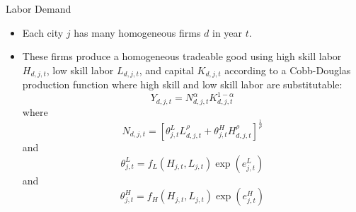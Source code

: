 \documentclass[aspectratio=169]{beamer}
\begin{document}
\begin{frame}{Labor Demand}

\begin{itemize}
    \item<1-> Each city $ j $ has many homogeneous firms $ d $ in year $ t $.
    \item<2-> These firms produce a homogeneous tradeable good using high skill labor $ H_{d,j,t} $, low skill labor $ L_{d,j,t} $, and capital $ K_{d,j,t} $ according to a Cobb-Douglas production function where high skill and low skill labor are substitutable:
    \begin{equation*}
        Y_{d,j,t} = N_{d,j,t}^{\alpha} K_{d,j,t}^{1 - \alpha}
    \end{equation*}
    where
    \begin{equation*}
        N_{d,j,t} = \left[ \theta_{j,t}^{L} L_{d,j,t}^{\rho} + \theta_{j,t}^{H} H_{d,j,t}^{\rho} \right]^{\frac{1}{\rho}}
    \end{equation*}
    and
    \begin{equation}
        \theta_{j,t}^{L} = f_{L}\left( H_{j,t}, L_{j,t} \right) \exp\left( e_{j,t}^L \right)
        \label{eq:lowskillproductivity}
    \end{equation}
    and
    \begin{equation}
        \theta_{j,t}^{H} = f_{H}\left( H_{j,t}, L_{j,t} \right) \exp\left( e_{j,t}^H \right)
        \label{eq:highskillproductivity}
    \end{equation}
\end{itemize}
    
\end{frame}

\end{document}
